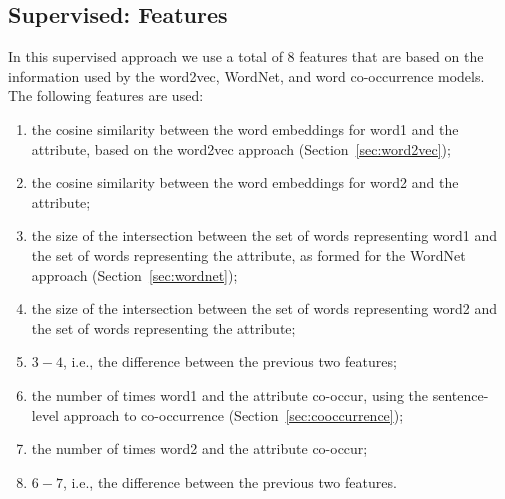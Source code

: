 \documentclass[11pt,a4paper]{article}
\newcommand{\secref}[1]{Section~\ref{#1}}
\begin{document}
\subsection{Supervised: Features}

In this supervised approach we use a total of 8 features that are
based on the information used by the word2vec, WordNet, and word
co-occurrence models. The following features are used:

\begin{enumerate}

\item the cosine similarity between the word embeddings for word1 and
  the attribute, based on the word2vec approach
  (\secref{sec:word2vec});


\item the cosine similarity between the word embeddings for word2 and
  the attribute;

\item the size of the intersection between the set of words
  representing word1 and the set of words representing the attribute,
  as formed for the WordNet approach (\secref{sec:wordnet});

\item the size of the intersection between the set of words
  representing word2 and the set of words representing the attribute;

\item $3 - 4$, i.e., the difference between the previous two
  features;

\item the number of times word1 and the attribute co-occur, using the
  sentence-level approach to co-occurrence
  (\secref{sec:cooccurrence});

\item the number of times word2 and the attribute co-occur;

\item $6 - 7$, i.e., the difference between the previous two features.

\end{enumerate}
\end{document}
